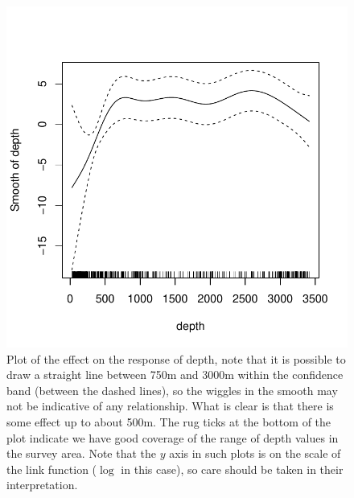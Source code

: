 \documentclass[a4paper,12pt]{article}
\begin{document}
\begin{figure}[h!]
  \caption{Plot of the effect on the response of depth, note that it is possible to draw a straight line between 750m and 3000m within the confidence band (between the dashed lines), so the wiggles in the smooth may not be indicative of any relationship. What is clear is that there is some effect up to about 500m. The rug ticks at the bottom of the plot indicate we have good coverage of the range of depth values in the survey area. Note that the $y$ axis in such plots is on the scale of the link function ($\log$ in this case), so care should be taken in their interpretation.}
  \label{depth-gamplot}
  \begin{center}
    \includegraphics[width=\textwidth]{figs/fit-depth-gam}
  \end{center}
\end{figure}

\newpage
\end{document}
